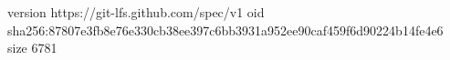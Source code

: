 version https://git-lfs.github.com/spec/v1
oid sha256:87807e3fb8e76e330cb38ee397c6bb3931a952ee90caf459f6d90224b14fe4e6
size 6781
